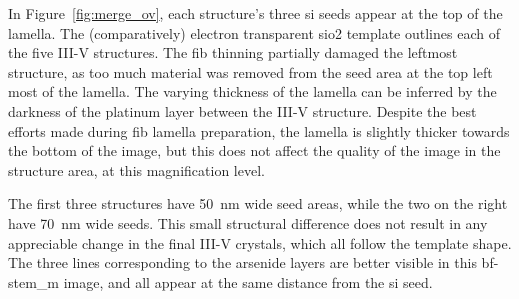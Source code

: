 In Figure~\ref{fig:merge_ov}, each structure's three \acl{si} seeds appear at the top of the lamella. The (comparatively) electron transparent \acs{sio2} template outlines each of the five III-V structures. The \acs{fib} thinning partially damaged the leftmost structure, as too much material was removed from the seed area at the top left most of the lamella. The varying thickness of the lamella can be inferred by the darkness of the platinum layer between the III-V structure. Despite the best efforts made during \acs{fib} lamella preparation, the lamella is slightly thicker towards the bottom of the image, but this does not affect the quality of the image in the structure area, at this magnification level.

The first three structures have \qty{50}{\nano\metre} wide seed areas, while the two on the right have \qty{70}{\nano\metre} wide seeds. This small structural difference does not result in any appreciable change in the final III-V crystals, which all follow the template shape. The three lines corresponding to the arsenide layers are better visible in this \acs{bf}-\acs{stem_m} image, and all appear at the same distance from the \acs{si} seed.

